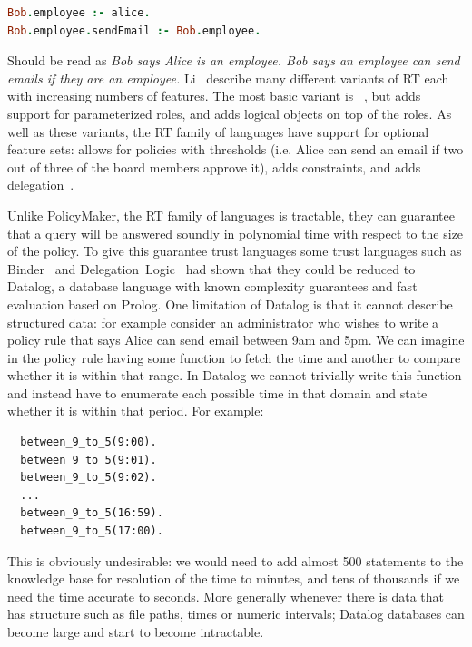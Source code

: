 \documentclass[thesis.tex]{subfiles}
\begin{document}
\begin{lstlisting}[language=prolog]
Bob.employee :- alice.
Bob.employee.sendEmail :- Bob.employee.
\end{lstlisting}

Should be read as \emph{Bob says Alice is an employee.  Bob says an
employee can send emails if they are an employee.}  Li~\etal{}
describe many different variants of RT each with increasing numbers of
features.  The most basic variant is
~\cite{li_distributed_2003}, but  adds support for
parameterized roles, and  adds logical objects on top of the
roles.  As well as these variants, the RT family of languages have
support for optional feature sets:  allows for policies with
thresholds (i.e. Alice can send an email if two out of three of the
board members approve it),  adds constraints, and 
adds delegation~\cite{ninghui_li_design_2002}.

Unlike PolicyMaker, the RT family of languages is tractable, they can
guarantee that a query will be answered soundly in polynomial time
with respect to the size of the policy.  To give this guarantee trust
languages some trust languages such as
Binder~\cite{detreville_binder_2002} and
Delegation~Logic~\cite{li_delegation_2003,li_practically_2000} had
shown that they could be reduced to Datalog, a database language with
known complexity guarantees and fast evaluation based on Prolog.  One
limitation of Datalog is that it cannot describe structured data: for
example consider an administrator who wishes to write a policy rule
that says Alice can send email between 9am and 5pm.  We can imagine in
the policy rule having some function to fetch the time and another to
compare whether it is within that range.  In Datalog we cannot
trivially write this function and instead have to enumerate each
possible time in that domain and state whether it is within that
period. For example:

\begin{lstlisting}
  between_9_to_5(9:00).
  between_9_to_5(9:01).
  between_9_to_5(9:02).
  ...
  between_9_to_5(16:59).
  between_9_to_5(17:00).
\end{lstlisting}

This is obviously undesirable: we would need to add almost 500
statements to the knowledge base for resolution of the time to
minutes, and tens of thousands if we need the time accurate to
seconds.  More generally whenever there is data that has structure
such as file paths, times or numeric intervals; Datalog databases can
become large and start to become intractable.
\end{document}
